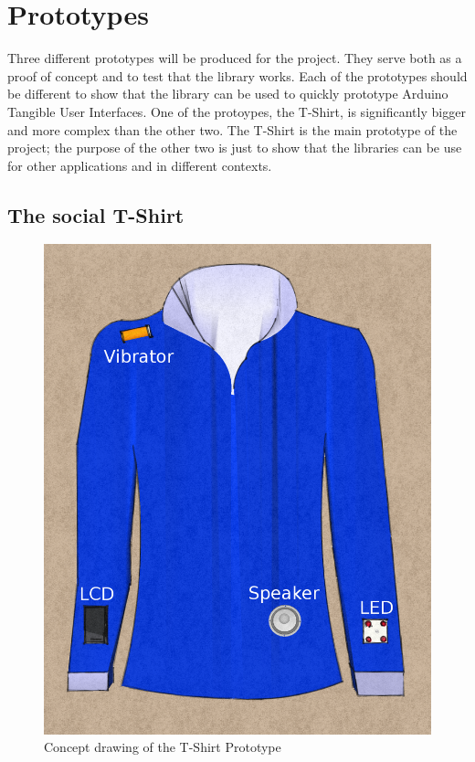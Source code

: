 \newpage
\section{Prototypes}
\label{sec:prototypes}
Three different prototypes will be produced for the project. They serve both as a proof of concept and
to test that the library works. Each of the prototypes should be different to show that the library can be
used to quickly prototype Arduino Tangible User Interfaces. One of the protoypes, the T-Shirt, is significantly
bigger and more complex than the other two. The T-Shirt is the main prototype of the project; the purpose of the other two
is just to show that the libraries can be use for other applications and in different contexts.

\subsection{The social T-Shirt}
	
\begin{figure}
\vspace{-20pt}
\begin{center}
\includegraphics[scale=0.2]{img/design-tshirtproto}
\end{center}
\vspace{-10pt}
\caption{Concept drawing of the T-Shirt Prototype}
\label{fig:design-TShirt}
\vspace{-50pt}
\end{figure}
	
